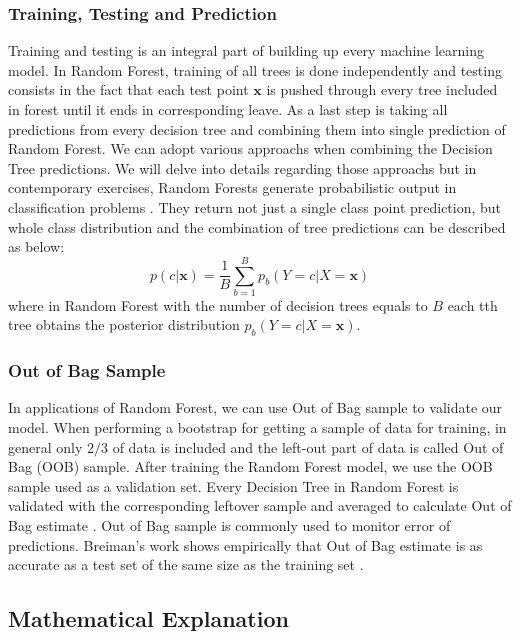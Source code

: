 \subsubsection {Training, Testing and Prediction}
Training and testing is an integral part of building up every machine learning model.
In Random Forest, training of all trees is done independently and testing consists in the fact that each test point $\textbf{x}$ is pushed 
through every tree included in forest until it ends in corresponding leave. As a last step is taking all predictions from 
every decision tree and combining them into single prediction of Random Forest. 
We can adopt various approachs when combining the Decision Tree predictions. We will delve into details regarding those approachs but in contemporary exercises, Random Forests generate probabilistic output in classification problems \cite{CGV-035}. 
They return not just a single class point prediction, but whole class distribution and the combination of tree predictions can be described as below:
\begin{equation}
	p(c|\textbf{x}) =  \frac{1}{B} \displaystyle\sum_{b=1}^{B} p_{b}(Y = c |X = \textbf{x})
\end{equation}
where in Random Forest with the number of decision trees equals to $B$ each tth tree obtains the posterior 
distribution $ p_{b}(Y = c |X = \textbf{x}) $.

\subsubsection {Out of Bag Sample}
In applications of Random Forest, we can use Out of Bag sample to validate our model.
When performing a bootstrap for getting a sample of data for training, in general only $2/3$ of data is included and the
left-out part of data is called Out of Bag (OOB) sample.
After training the Random Forest model, we use the OOB sample used as a validation set. 
Every Decision Tree in Random Forest is validated with the corresponding leftover sample and averaged to calculate Out of Bag estimate \cite{friedman2001elements}. Out of Bag sample is commonly used to monitor error of predictions. 
Breiman’s work \cite{Breiman1996OUT-OF-BAG-E} shows empirically that Out of Bag estimate is as accurate 
as a test set of the same size as the training set \cite{Breiman1996OUT-OF-BAG-E}.

\subsection{Mathematical Explanation}

